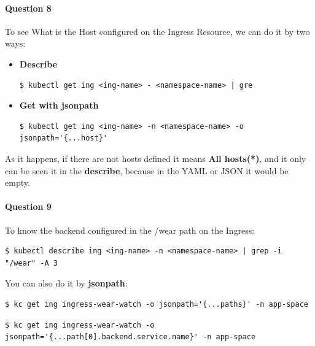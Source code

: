 \documentclass{article}
\newenvironment{blocktemplateIII}[1]{%
    \tcolorbox[beamer,%
    noparskip,breakable,
    ,colframe=Red,%
    colbacklower=LimeGreen!75!LightGreen,%
    title=#1]}%
    {\endtcolorbox}
\newenvironment{codetemplate}[1][]{%
  \mybasecolorbox[#1]
  \itshape
}{%
  \endmybasecolorbox
}
\begin{document}
\paragraph{Question 8}
To see What is the Host configured on the Ingress Resource, we can do it by two ways:
\begin{itemize}
    \item \textbf{Describe}
\begin{codetemplate}{}
\begin{verbatim}
$ kubectl get ing <ing-name> - <namespace-name> | gre 
\end{verbatim}
\end{codetemplate}

    \item \textbf{Get with jsonpath}
\begin{codetemplate}{}
\begin{verbatim}
$ kubectl get ing <ing-name> -n <namespace-name> -o jsonpath='{...host}'
\end{verbatim}
\end{codetemplate}
\end{itemize}

\begin{blocktemplateIII}{WARNING}
As it happens, if there are not hosts defined it means \textbf{All hosts(*)}, and it only can be seen it in the \textbf{describe}, because in the YAML or JSON it would be empty.
\end{blocktemplateIII}

\paragraph{Question 9}
To know the backend configured in the /wear path on the Ingress:

\begin{codetemplate}{}
\begin{verbatim}
$ kubectl describe ing <ing-name> -n <namespace-name> | grep -i "/wear" -A 3
\end{verbatim}
\end{codetemplate}

You can also do it by \textbf{jsonpath}:
\begin{codetemplate}{}
\begin{verbatim}
$ kc get ing ingress-wear-watch -o jsonpath='{...paths}' -n app-space
\end{verbatim}
\end{codetemplate}

\begin{codetemplate}{}
\begin{verbatim}
$ kc get ing ingress-wear-watch -o jsonpath='{...path[0].backend.service.name}' -n app-space
\end{verbatim}
\end{codetemplate}
\end{document}
